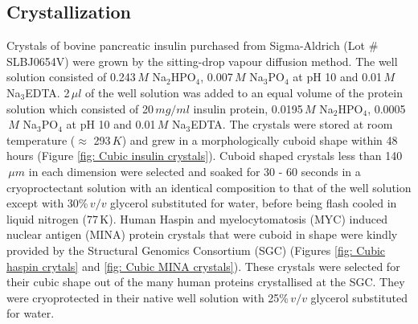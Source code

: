 \subsection{Crystallization}
\label{sub:Crystallisation}
Crystals of bovine pancreatic insulin purchased from Sigma-Aldrich (Lot \# SLBJ0654V) were grown by the sitting-drop vapour diffusion method.
The well solution consisted of 0.243$\, M$ Na$_{\text{2}}$HPO$_{\text{4}}$, 0.007$\, M$ Na$_{\text{3}}$PO$_{\text{4}}$ at pH 10 and 0.01$\,M$ Na$_{\text{3}}$EDTA.
2$\, \mu l$ of the well solution was added to an equal volume of the protein solution which consisted of 20$\, mg/ml$ insulin protein, 0.0195$\, M$ Na$_{\text{2}}$HPO$_{\text{4}}$, 0.0005$\, M$ Na$_{\text{3}}$PO$_{\text{4}}$ at pH 10 and 0.01$\, M$ Na$_\text{3}$EDTA.
The crystals were stored at room temperature ($\approx$ 293$\,K$) and grew in a morphologically cuboid shape within 48 hours (Figure \ref{fig: Cubic insulin crystals}).
Cuboid shaped crystals less than 140$\, \mu m$ in each dimension were selected and soaked for 30 - 60 seconds in a cryoproctectant solution with an identical composition to that of the well solution except with 30\%$\, v/v$ glycerol substituted for water, before being flash cooled in liquid nitrogen (77$\,$K).
\newline
Human Haspin and myelocytomatosis (MYC) induced nuclear antigen (MINA) protein crystals that were cuboid in shape were kindly provided by the Structural Genomics Consortium (SGC) (Figures \ref{fig: Cubic haspin crytals} and \ref{fig: Cubic MINA crystals}).
These crystals were selected for their cubic shape out of the many human proteins crystallised at the SGC.
They were cryoprotected in their native well solution with 25\%$\, v/v$ glycerol substituted for water.

